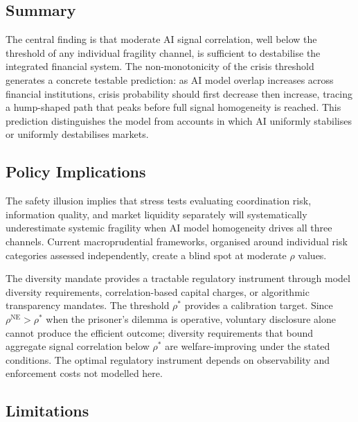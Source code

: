 \label{sec:conclusion}

\subsection{Summary}

The central finding is that moderate AI signal correlation, well below the threshold of any individual fragility channel, is sufficient to destabilise the integrated financial system. The non-monotonicity of the crisis threshold generates a concrete testable prediction: as AI model overlap increases across financial institutions, crisis probability should first decrease then increase, tracing a hump-shaped path that peaks before full signal homogeneity is reached. This prediction distinguishes the model from accounts in which AI uniformly stabilises or uniformly destabilises markets.

\subsection{Policy Implications}

The safety illusion implies that stress tests evaluating coordination risk, information quality, and market liquidity separately will systematically underestimate systemic fragility when AI model homogeneity drives all three channels. Current macroprudential frameworks, organised around individual risk categories assessed independently, create a blind spot at moderate $\rho$ values.

The diversity mandate provides a tractable regulatory instrument through model diversity requirements, correlation-based capital charges, or algorithmic transparency mandates. The threshold $\rho^*$ provides a calibration target. Since $\rho^{\text{NE}} > \rho^*$ when the prisoner's dilemma is operative, voluntary disclosure alone cannot produce the efficient outcome; diversity requirements that bound aggregate signal correlation below $\rho^*$ are welfare-improving under the stated conditions. The optimal regulatory instrument depends on observability and enforcement costs not modelled here.
\subsection{Limitations}

